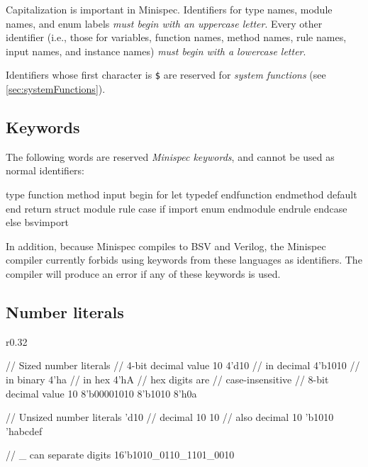 Capitalization is important in Minispec.
Identifiers for type names, module names, and enum labels \emph{must begin with an uppercase letter}.
Every other identifier (i.e., those for variables, function names, method names, rule names, input names, and instance names)
\emph{must begin with a lowercase letter}.

Identifiers whose first character is \texttt{\$} are reserved for \emph{system functions}
(see \autoref{sec:systemFunctions}).

\subsection{Keywords}

The following words are reserved \emph{Minispec keywords}, and cannot be used as normal identifiers:

\begin{mscode}
type       function       method       input      begin    for          let
typedef    endfunction    endmethod    default    end      return
struct     module         rule         case       if       import
enum       endmodule      endrule      endcase    else     bsvimport    
\end{mscode}

In addition, because Minispec compiles to BSV and Verilog, the Minispec compiler currently forbids using keywords from these languages as identifiers.
The compiler will produce an error if any of these keywords is used.

\subsection{Number literals}

\begin{wrapfigure}{r}{0.32\columnwidth}
\vspace{-2em}
\begin{mscode}
// Sized number literals
// 4-bit decimal value 10
4'd10    // in decimal
4'b1010  // in binary
4'ha     // in hex
4'hA     // hex digits are
         // case-insensitive
// 8-bit decimal value 10
8'b00001010
8'b1010
8'h0a

// Unsized number literals
'd10  // decimal 10
10    // also decimal 10
'b1010
'habcdef

// _ can separate digits
16'b1010_0110_1101_0010
\end{mscode}
\vspace{-2em}
\end{wrapfigure}

